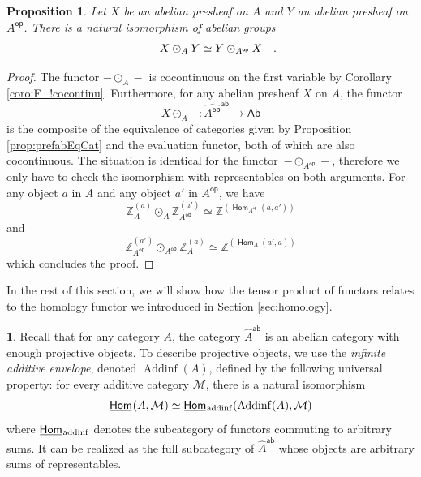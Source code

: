 \documentclass[10pt, english, a4paper, nothms]{amsart}
\theoremstyle{plain}
\newtheorem{prop}[theorem]{Proposition}
\theoremstyle{remark}
\theoremstyle{definition}
\newtheorem{paragr}[theorem]{}
\numberwithin{equation}{theorem}
\newcommand\Z{\mathbb{Z}}
\newcommand{\Hom}{\operatorname{\mathsf{Hom}}}
\newcommand{\Homi}{\operatorname{\kern.5truept\underline{\kern-.5truept\mathsf{Hom}\kern-.5truept}\kern1truept}}
\DeclareMathOperator{\op}{\mathsf{op}}
\newcommand{\M}{\mathcal{M}}
\newcommand{\Ab}{{\mathsf{Ab}}}
\newcommand{\Addinf}{\operatorname{\mathrm{Addinf}}}
\newcommand{\Homaddinf}{\operatorname{\kern.5truept\underline{\kern-.5truept\mathsf{Hom}\kern-.5truept}\kern1truept_{\mathrm{addinf}}}}
\newcommand{\Wh}[2]{\Z_{#1}^{\left(#2\right)}}
\newcommand{\prefab}[1]{\widehat{ #1 }^{\mathsf{ab}}}
\newcommand\zbox[1]{\makebox[0pt][l]{#1}}
\newcommand\pbox[1]{\zbox{\quad #1}} %
\begin{document}
\begin{prop}\label{prop:tensorProductSymmetry}
Let $X$ be an abelian presheaf on $A$ and $Y$ an abelian presheaf on
${A}^{\op}$. There is a natural isomorphism of abelian groups 
\[
X \odot_A Y \simeq Y \odot_{{A}^{\op}} X \pbox{.}
\]

\end{prop}
\begin{proof}
The functor $- \odot_A -$
is cocontinuous on the first variable by Corollary
\ref{coro:F_!cocontinu}. Furthermore, for any abelian presheaf $X$ on
$A$, the functor
\[
  X \odot_A -: \prefab{{A}^{\op}} \to \Ab
  \]
is the composite of the equivalence of categories given by Proposition
\ref{prop:prefabEqCat} and the evaluation functor, both of which are also
cocontinuous.
The situation is identical for the functor~$- \odot_{{A}^{\op}} -$, therefore we
only have to check the isomorphism with representables on both arguments. For
any object $a$ in $A$ and any object $a'$ in
${A}^{\op}$, we have 
\[ \Wh{A}{a} \odot_A \Wh{{A}^{\op}}{a'} \simeq
\Z^{(\Hom_{{A}^{\op}}(a,a'))}
\]
and
\[  \Wh{A^{\op}}{a'} \odot_{A^{\op}} \Wh{A}{a} \simeq
\Z^{(\Hom_A(a',a))}  
\]
which concludes the proof.
\end{proof}

In the rest of this section, we will show how the tensor product of
functors relates to the homology functor we introduced in Section
\ref{sec:homology}.

\begin{paragr}
Recall that for any category $A$, the category $\prefab{A}$ is an
abelian category with enough projective objects. To describe
projective objects, we use the \emph{infinite additive envelope},
denoted $\Addinf(A)$, defined by the following universal property:
for every additive category $\M$, there is a natural isomorphism 
\[
\Homi(A,\M) \simeq \Homaddinf(\Addinf(A),\M) 
\]
where $\Homaddinf$ denotes the subcategory of functors commuting to arbitrary
sums. 
It can be realized as the full subcategory of $\prefab{A}$ whose objects
are arbitrary sums of representables.
\end{paragr}
\end{document}
